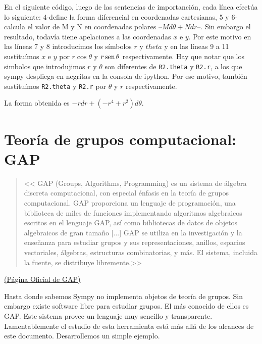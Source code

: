\begin{subappendices}
En el siguiente código, luego de las sentencias de importanción, cada línea efectúa lo siguiente: 4-define la forma diferencial en coordenadas cartesianas, 5 y 6-calcula el valor de M y N en coordenadas polares --$Md\theta+N dr$--. Sin embargo el resultado, todavía tiene apelaciones a las coordenadas $x$ e $y$. Por este motivo en las líneas 7 y 8 introducimos los símbolos $r$ y $theta$ y en las líneas 9 a 11 sustituímos $x$ e $y$ por $r\cos\theta$ y $r\operatorname{sen}\theta$ respectivamente. Hay que notar que los simbolos que introdujimos $r$ y $\theta$ son diferentes de \texttt{R2.theta} y \texttt{R2.r}, a los que sympy despliega en negritas en la consola de ipython.  Por ese motivo, también sustituímos   \texttt{R2.theta} y \texttt{R2.r} por $\theta$ y $r$ respectivamente.

 

La forma obtenida es $-rdr+(-r^4+r^2)d\theta$.




\section{Teoría de grupos computacional: GAP}


\begin{quote}
 <<
GAP (Groups, Algorithms, Programming) es un sistema de álgebra discreta computacional, con especial énfasis en la teoría de grupos computacional. GAP proporciona un lenguaje de programación, una biblioteca de miles de funciones implementando algoritmos algebraicos escritos en el lenguaje GAP, así como bibliotecas de datos de objetos algebraicos de gran tamaño [...] GAP se utiliza en la investigación y la enseñanza para estudiar grupos y sus representaciones, anillos, espacios vectoriales, álgebras, estructuras combinatorias, y más. El sistema, incluida la fuente, se distribuye libremente.>>
\end{quote}
\begin{flushright}
 \href{https://www.gap-system.org/}{(Página Oficial de GAP)}\link
\end{flushright}

Hasta donde sabemos Sympy no implementa objetos de teoría de grupos. Sin embargo existe software libre para estudiar grupos. El más conocido de ellos es GAP. Este sistema provee un lenguaje muy sencillo y transparente. Lamentablemente el estudio de esta herramienta está más allá de los alcances de este documento. Desarrollemos un simple ejemplo.


\end{subappendices}
